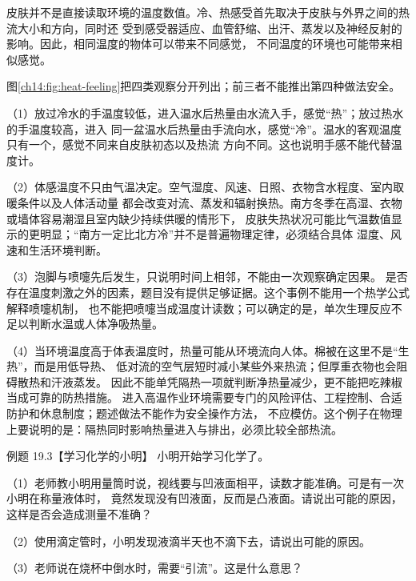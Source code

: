 \begin{xesolution}
皮肤并不是直接读取环境的温度数值。冷、热感受首先取决于皮肤与外界之间的热流大小和方向，同时还
受到感受器适应、血管舒缩、出汗、蒸发以及神经反射的影响。因此，相同温度的物体可以带来不同感觉，
不同温度的环境也可能带来相似感觉。

图\ref{ch14:fig:heat-feeling}把四类观察分开列出；前三者不能推出第四种做法安全。
\heatFeelingDiagram

（1）放过冷水的手温度较低，进入温水后热量由水流入手，感觉“热”；放过热水的手温度较高，进入
同一盆温水后热量由手流向水，感觉“冷”。温水的客观温度只有一个，感觉不同来自皮肤初态以及热流
方向不同。这也说明手感不能代替温度计。

（2）体感温度不只由气温决定。空气湿度、风速、日照、衣物含水程度、室内取暖条件以及人体活动量
都会改变对流、蒸发和辐射换热。南方冬季在高湿、衣物或墙体容易潮湿且室内缺少持续供暖的情形下，
皮肤失热状况可能比气温数值显示的更明显；“南方一定比北方冷”并不是普遍物理定律，必须结合具体
湿度、风速和生活环境判断。

（3）泡脚与喷嚏先后发生，只说明时间上相邻，不能由一次观察确定因果。
是否存在温度刺激之外的因素，题目没有提供足够证据。这个事例不能用一个热学公式解释喷嚏机制，
也不能把喷嚏当成温度计读数；可以确定的是，单次生理反应不足以判断水温或人体净吸热量。

（4）当环境温度高于体表温度时，热量可能从环境流向人体。棉被在这里不是“生热”，而是用低导热、
低对流的空气层短时减小某些外来热流；但厚重衣物也会阻碍散热和汗液蒸发。
因此不能单凭隔热一项就判断净热量减少，更不能把吃辣椒当成可靠的防热措施。
进入高温作业环境需要专门的风险评估、工程控制、合适防护和休息制度；题述做法不能作为安全操作方法，
不应模仿。这个例子在物理上要说明的是：隔热同时影响热量进入与排出，必须比较全部热流。
\end{xesolution}

\begin{origexamplebox}{例题 19.3【学习化学的小明】}
小明开始学习化学了。

（1）老师教小明用量筒时说，视线要与凹液面相平，读数才能准确。可是有一次小明在称量液体时，
竟然发现没有凹液面，反而是凸液面。请说出可能的原因，这样是否会造成测量不准确？

（2）使用滴定管时，小明发现液滴半天也不滴下去，请说出可能的原因。

（3）老师说在烧杯中倒水时，需要“引流”。这是什么意思？
\end{origexamplebox}

